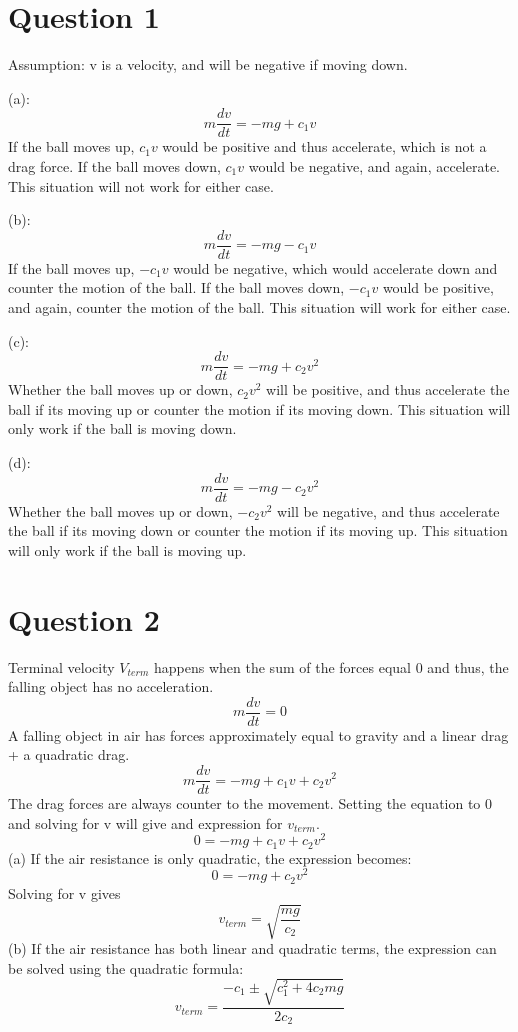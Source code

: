 \documentclass[a4paper,12pt]{article}
\begin{document}
\section*{Question 1}
Assumption: v is a velocity, and will be negative if moving down.

(a): \[m\frac{dv}{dt}=-mg+c_1v\] If the ball moves up, $c_1v$ would be
positive and thus accelerate, which is not a drag force.  If the ball
moves down, $c_1v$ would be negative, and again, accelerate.  This
situation will not work for either case.

(b):\[m\frac{dv}{dt}=-mg-c_1v\] If the ball moves up, $-c_1v$ would be
negative, which would accelerate down and counter the motion of the
ball.  If the ball moves down, $-c_1v$ would be positive, and again,
counter the motion of the ball.  This situation will work for either case.

(c):\[m\frac{dv}{dt}=-mg+c_2v^2\] Whether the ball moves up or down,
$c_2v^2$ will be positive, and thus accelerate the ball if its moving
up or counter the motion if its moving down.  This situation will only
work if the ball is moving down.

(d):\[m\frac{dv}{dt}=-mg-c_2v^2\] Whether the ball moves up or down,
$-c_2v^2$ will be negative, and thus accelerate the ball if its moving
down or counter the motion if its moving up.  This situation will only
work if the ball is moving up.

\section*{Question 2}

Terminal velocity $V_{term}$ happens when the sum of the forces equal
0 and thus, the falling object has no acceleration.
\[m\frac{dv}{dt}=0\]
A falling object in air has forces approximately equal to gravity and
a linear drag + a quadratic drag.
\[m\frac{dv}{dt}=-mg+c_1v+c_2v^2\]
The drag forces are always counter to the movement.  Setting the
equation to 0 and solving for v will give and expression for
$v_{term}$.
\[0=-mg+c_1v+c_2v^2\]
(a) If the air resistance is only quadratic, the expression becomes:
\[0=-mg+c_2v^2\]Solving for v gives\[v_{term}=\sqrt{\frac{mg}{c_2}}\]
(b) If the air resistance has both linear and quadratic terms, the
expression can be solved using the quadratic formula:
\[v_{term}=\frac{-c_1\pm\sqrt{c_1^2+4c_2mg}}{2c_2}\]
\end{document}
